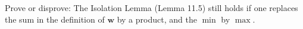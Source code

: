 \documentclass[english]{uebung_cs}
\begin{document}
\begin{exercise}
  Prove or disprove:
  The Isolation Lemma (Lemma 11.5) still holds if one replaces the sum in the definition of $\textbf{w}$ by a product,
  and the $\min$ by $\max$.
\end{exercise}
\end{document}
